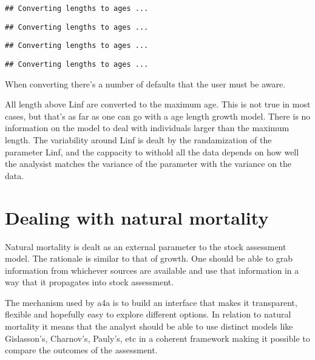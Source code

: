 \documentclass[a4paper,english,10pt]{article}\usepackage[]{graphicx}\usepackage[]{color}
\makeatletter
\newenvironment{kframe}{%
 \def\at@end@of@kframe{}%
 \ifinner\ifhmode%
  \def\at@end@of@kframe{\end{minipage}}%
  \begin{minipage}{\columnwidth}%
 \fi\fi%
 \def\FrameCommand##1{\hskip\@totalleftmargin \hskip-\fboxsep
 \colorbox{shadecolor}{##1}\hskip-\fboxsep
     \hskip-\linewidth \hskip-\@totalleftmargin \hskip\columnwidth}%
 \MakeFramed {\advance\hsize-\width
   \@totalleftmargin\z@ \linewidth\hsize
   \@setminipage}}%
 {\par\unskip\endMakeFramed%
 \at@end@of@kframe}
\newenvironment{knitrout}{}{} %
\makeatother
\begin{document}
\begin{knitrout}
\begin{kframe}
{\ttfamily\noindent\color{warningcolor}{\#\# Warning: NaNs produced}}\begin{verbatim}
## Converting lengths to ages ...
\end{verbatim}


{\ttfamily\noindent\color{warningcolor}{\#\# Warning: NaNs produced}}\begin{verbatim}
## Converting lengths to ages ...
\end{verbatim}


{\ttfamily\noindent\color{warningcolor}{\#\# Warning: NaNs produced}}\begin{verbatim}
## Converting lengths to ages ...
\end{verbatim}


{\ttfamily\noindent\color{warningcolor}{\#\# Warning: NaNs produced}}\begin{verbatim}
## Converting lengths to ages ...
\end{verbatim}


{\ttfamily\noindent\color{warningcolor}{\#\# Warning: NaNs produced}}\end{kframe}
\end{knitrout}


When converting there's a number of defaults that the user must be aware. 

All length above Linf are converted to the maximum age. This is not true in most cases, but that's as far as one can go with a age length growth model. There is no information on the model to deal with individuals larger than the maximum length. The variability around Linf is dealt by the randamization of the parameter Linf, and the cappacity to withold all the data depends on how well the analysist matches the variance of the parameter with the variance on the data.

\section{Dealing with natural mortality}

Natural mortality is dealt as an external parameter to the stock assessment model. The rationale is similar to that of growth. One should be able to grab information from whichever sources are available and use that information in a way that it propagates into stock assessment.

The mechanism used by a4a is to build an interface that makes it transparent, flexible and hopefully easy to explore different options. In relation to natural mortality it means that the analyst should be able to use distinct models like Gislasson's, Charnov's, Pauly's, etc in a coherent framework making it possible to compare the outcomes of the assessment. 
\end{document}
